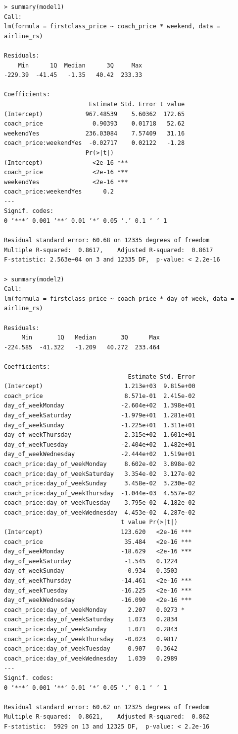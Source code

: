 \documentclass[11pt,a4paper]{article}
\begin{document}
\begin{verbatim}
> summary(model1)
Call:
lm(formula = firstclass_price ~ coach_price * weekend, data = airline_rs)

Residuals:
    Min      1Q  Median      3Q     Max 
-229.39  -41.45   -1.35   40.42  233.33 

Coefficients:
                        Estimate Std. Error t value
(Intercept)            967.48539    5.60362  172.65
coach_price              0.90393    0.01718   52.62
weekendYes             236.03084    7.57409   31.16
coach_price:weekendYes  -0.02717    0.02122   -1.28
                       Pr(>|t|)    
(Intercept)              <2e-16 ***
coach_price              <2e-16 ***
weekendYes               <2e-16 ***
coach_price:weekendYes      0.2    
---
Signif. codes:  
0 ‘***’ 0.001 ‘**’ 0.01 ‘*’ 0.05 ‘.’ 0.1 ‘ ’ 1

Residual standard error: 60.68 on 12335 degrees of freedom
Multiple R-squared:  0.8617,	Adjusted R-squared:  0.8617 
F-statistic: 2.563e+04 on 3 and 12335 DF,  p-value: < 2.2e-16

> summary(model2)
Call:
lm(formula = firstclass_price ~ coach_price * day_of_week, data = airline_rs)

Residuals:
     Min       1Q   Median       3Q      Max 
-224.585  -41.322   -1.209   40.272  233.464 

Coefficients:
                                   Estimate Std. Error
(Intercept)                       1.213e+03  9.815e+00
coach_price                       8.571e-01  2.415e-02
day_of_weekMonday                -2.604e+02  1.398e+01
day_of_weekSaturday              -1.979e+01  1.281e+01
day_of_weekSunday                -1.225e+01  1.311e+01
day_of_weekThursday              -2.315e+02  1.601e+01
day_of_weekTuesday               -2.404e+02  1.482e+01
day_of_weekWednesday             -2.444e+02  1.519e+01
coach_price:day_of_weekMonday     8.602e-02  3.898e-02
coach_price:day_of_weekSaturday   3.354e-02  3.127e-02
coach_price:day_of_weekSunday     3.458e-02  3.230e-02
coach_price:day_of_weekThursday  -1.044e-03  4.557e-02
coach_price:day_of_weekTuesday    3.795e-02  4.182e-02
coach_price:day_of_weekWednesday  4.453e-02  4.287e-02
                                 t value Pr(>|t|)    
(Intercept)                      123.620   <2e-16 ***
coach_price                       35.484   <2e-16 ***
day_of_weekMonday                -18.629   <2e-16 ***
day_of_weekSaturday               -1.545   0.1224    
day_of_weekSunday                 -0.934   0.3503    
day_of_weekThursday              -14.461   <2e-16 ***
day_of_weekTuesday               -16.225   <2e-16 ***
day_of_weekWednesday             -16.090   <2e-16 ***
coach_price:day_of_weekMonday      2.207   0.0273 *  
coach_price:day_of_weekSaturday    1.073   0.2834    
coach_price:day_of_weekSunday      1.071   0.2843    
coach_price:day_of_weekThursday   -0.023   0.9817    
coach_price:day_of_weekTuesday     0.907   0.3642    
coach_price:day_of_weekWednesday   1.039   0.2989    
---
Signif. codes:  
0 ‘***’ 0.001 ‘**’ 0.01 ‘*’ 0.05 ‘.’ 0.1 ‘ ’ 1

Residual standard error: 60.62 on 12325 degrees of freedom
Multiple R-squared:  0.8621,	Adjusted R-squared:  0.862 
F-statistic:  5929 on 13 and 12325 DF,  p-value: < 2.2e-16
\end{verbatim}
\end{document}
